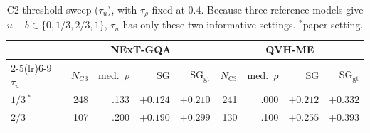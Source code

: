 \begin{table}[t]
\centering
\scriptsize
\setlength{\tabcolsep}{3pt}
\caption{C2 threshold sweep ($\tau_u$), with $\tau_{\rho}$ fixed at $0.4$. Because three reference models give $u-b\in\{0,1/3,2/3,1\}$, $\tau_u$ has only these two informative settings. $^{\ast}$paper setting.}
\label{tab:a2_c2_sweep}
\begin{tabular}{l rrrr rrrr}
\toprule
& \multicolumn{4}{c}{NExT-GQA} & \multicolumn{4}{c}{QVH-ME} \\
\cmidrule(lr){2-5}\cmidrule(lr){6-9}
$\tau_{u}$ & $N_{\text{C3}}$ & med.\ $\rho$ & SG & SG$_{\text{gt}}$ & $N_{\text{C3}}$ & med.\ $\rho$ & SG & SG$_{\text{gt}}$ \\
\midrule
$1/3$\,$^{\ast}$ & 248 & .133 & $+0.124$ & $+0.210$ & 241 & .000 & $+0.212$ & $+0.332$ \\
$2/3$ & 107 & .200 & $+0.190$ & $+0.299$ & 130 & .100 & $+0.255$ & $+0.393$ \\
\bottomrule
\end{tabular}
\end{table}
